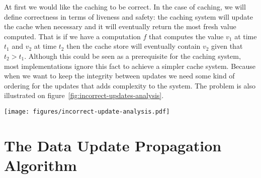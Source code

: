 
At first we would like the caching to be correct. In the case of caching, we will define correctness in terms of liveness and safety: the caching system will update the cache when necessary and it will eventually return the most fresh value computed. That is if we have a computation $f$ that computes the value $v_1$ at time $t_1$ and $v_2$ at time $t_2$ then the cache store will eventually contain $v_2$ given that $t_2 > t_1$. Although this could be seen as a prerequisite for the caching system, most implementations ignore this fact to achieve a simpler cache system. Because when we want to keep the integrity between updates we need some kind of ordering for the updates that adds complexity to the system. The problem is also illustrated on figure~\ref{fig:incorrect-updates-analysis}.

\begin{figure*}[ht!]
  \centering
  \texttt{[image: figures/incorrect-update-analysis.pdf]}
  \caption{Showing how two concurrent caching updates from two different application servers results in an inconsistent state. We see that even though the request from \emph{Web 2} are based on data older than \emph{Web 1} it gets to write }
  \label{fig:incorrect-updates-analysis}
\end{figure*}



\section{The Data Update Propagation Algorithm}
\label{sec:the-data-update-propagation-algorithm}



